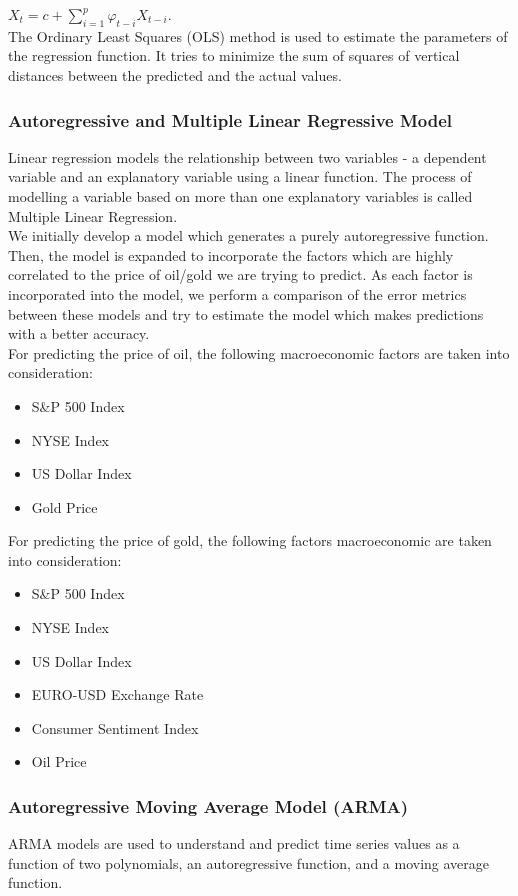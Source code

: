 \documentclass[runningheads]{llncs}
\begin{document}
$ X_{t} = c + \sum\limits_{i=1}^p \varphi_{t-i}X_{t-i}$. \\

\noindent The Ordinary Least Squares (OLS) method is used to estimate the parameters of the regression function. It tries to minimize the sum of squares of vertical distances between the predicted and the actual values. 

\subsubsection{Autoregressive and Multiple Linear Regressive Model}
Linear regression models the relationship between two variables - a dependent variable and an explanatory variable using a linear function. The process of modelling a variable based on more than one explanatory variables is called Multiple Linear Regression. \\
   
\noindent We initially develop a model which generates a purely autoregressive function. Then, the model is expanded to incorporate the factors which are highly correlated to the price of oil/gold we are trying to predict. As each factor is incorporated into the model, we perform a comparison of the error metrics between these models and try to estimate the model which makes predictions with a better accuracy.\\

For predicting the price of oil, the following macroeconomic factors are taken into consideration:
\begin {itemize}
\item S\&P 500 Index
\item NYSE Index
\item US Dollar Index
\item Gold Price
\end {itemize}

For predicting the price of gold, the following factors macroeconomic are taken into consideration:
\begin {itemize}
\item S\&P 500 Index
\item NYSE Index
\item US Dollar Index
\item EURO-USD Exchange Rate
\item Consumer Sentiment Index
\item Oil Price
\end {itemize}


\subsubsection{Autoregressive Moving Average Model (ARMA)}
ARMA models are used to understand and predict time series values as a function of two polynomials, an autoregressive function, and a moving average function. 
\\
\end{document}
